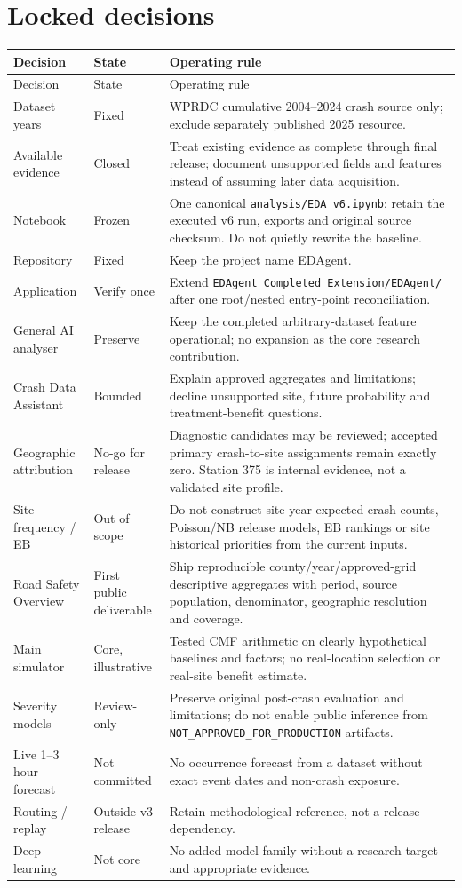 \documentclass[11pt,a4paper,openany]{report}
\newcommand{\pathcode}[1]{\nolinkurl{#1}}
\begin{document}
\section{Locked decisions}
\small
\begin{longtable}{@{}L{35mm}L{18mm}L{91mm}@{}}
\toprule Decision & State & Operating rule\\\midrule\endfirsthead
\toprule Decision & State & Operating rule\\\midrule\endhead
Dataset years & Fixed & WPRDC cumulative 2004--2024 crash source only; exclude separately published 2025 resource.\\
Available evidence & Closed & Treat existing evidence as complete through final release; document unsupported fields and features instead of assuming later data acquisition.\\
Notebook & Frozen & One canonical \pathcode{analysis/EDA_v6.ipynb}; retain the executed v6 run, exports and original source checksum. Do not quietly rewrite the baseline.\\
Repository & Fixed & Keep the project name EDAgent.\\
Application & Verify once & Extend \pathcode{EDAgent_Completed_Extension/EDAgent/} after one root/nested entry-point reconciliation.\\
General AI analyser & Preserve & Keep the completed arbitrary-dataset feature operational; no expansion as the core research contribution.\\
Crash Data Assistant & Bounded & Explain approved aggregates and limitations; decline unsupported site, future probability and treatment-benefit questions.\\
Geographic attribution & No-go for release & Diagnostic candidates may be reviewed; accepted primary crash-to-site assignments remain exactly zero. Station 375 is internal evidence, not a validated site profile.\\
Site frequency / EB & Out of scope & Do not construct site-year expected crash counts, Poisson/NB release models, EB rankings or site historical priorities from the current inputs.\\
Road Safety Overview & First public deliverable & Ship reproducible county/year/approved-grid descriptive aggregates with period, source population, denominator, geographic resolution and coverage.\\
Main simulator & Core, illustrative & Tested CMF arithmetic on clearly hypothetical baselines and factors; no real-location selection or real-site benefit estimate.\\
Severity models & Review-only & Preserve original post-crash evaluation and limitations; do not enable public inference from \pathcode{NOT_APPROVED_FOR_PRODUCTION} artifacts.\\
Live 1--3 hour forecast & Not committed & No occurrence forecast from a dataset without exact event dates and non-crash exposure.\\
Routing / replay & Outside v3 release & Retain methodological reference, not a release dependency.\\
Deep learning & Not core & No added model family without a research target and appropriate evidence.\\
\bottomrule
\end{longtable}
\end{document}
